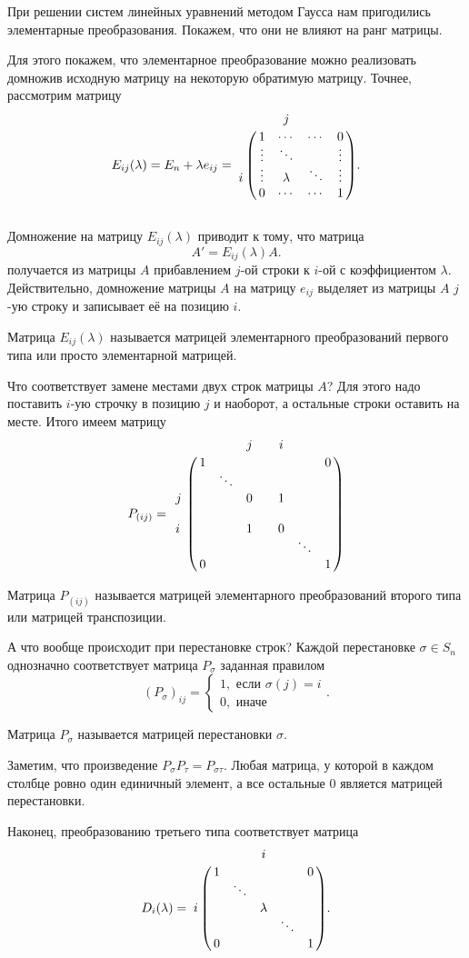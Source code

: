 При решении систем линейных уравнений методом Гаусса нам пригодились элементарные преобразования. Покажем, что они не влияют на ранг матрицы.

Для этого покажем, что элементарное преобразование можно реализовать домножив исходную матрицу на некоторую обратимую матрицу. Точнее, рассмотрим матрицу
$$ E_{ij}(\lambda)=E_n +\lambda e_{ij}=
\bordermatrix{
 & &j&& \cr
 &1&\cdots&\cdots&0\cr
 &\vdots&\ddots && \vdots\cr
i&\vdots& \lambda & \ddots& \vdots\cr
 &0&\cdots& \cdots&1
}.
$$\\
Домножение на матрицу $E_{ij}(\lambda)$ приводит к тому, что матрица
$$A'=E_{ij}(\lambda)A.$$
получается из матрицы $A$ прибавлением $j$-ой строки к $i$-ой с коэффициентом $\lambda$.
Действительно, домножение матрицы $A$ на матрицу $e_{ij}$ выделяет из матрицы $A$ $j$-ую строку и записывает её на позицию $i$.

\dfn Матрица $E_{ij}(\lambda)$ называется матрицей элементарного преобразований первого типа или просто элементарной матрицей.
\edfn

Что соответствует замене местами двух строк матрицы $A$? Для этого надо поставить $i$-ую строчку в позицию $j$ и наоборот, а остальные строки оставить на месте. Итого имеем матрицу
$$P_{(ij)}=\,\bordermatrix{
 & & &j& & i& \cr
 &1& & & & & &0\cr
 & &\ddots & & & & \cr
j\,& && 0 & & 1 & &\cr
\,& &&  & &  & &\cr
i\,& && 1 & &0 & &\cr
 & & & & & & \ddots& \cr
 &0& & & & & &1
}
$$


\dfn Матрица $P_{(ij)}$ называется матрицей элементарного преобразований второго типа или матрицей транспозиции.
\edfn

А что вообще происходит при перестановке строк? Каждой перестановке $\sigma \in S_n$ однозначно соответствует матрица $P_{\sigma}$ заданная правилом
$$(P_{\sigma})_{ij}= \begin{cases}
1, \text{ если $\sigma(j)=i$}\\
0, \text{ иначе }
\end{cases}.$$


\dfn Матрица $P_{\sigma}$ называется матрицей перестановки $\sigma$.
\edfn


\rm Заметим, что произведение $P_{\sigma} P_{\tau}=P_{\sigma\tau}$.  Любая матрица, у которой в каждом столбце ровно один единичный элемент, а все остальные 0 является матрицей перестановки.
\erm

Наконец, преобразованию третьего типа соответствует матрица
$$ D_{i}(\lambda)=
\bordermatrix{
 & &&i&& \cr
 &1&&&&0\cr
 &&\ddots &&& \cr
i&&  & \lambda && \cr
&&  &  &\ddots& \cr
 &0&& &&1
}.
$$

